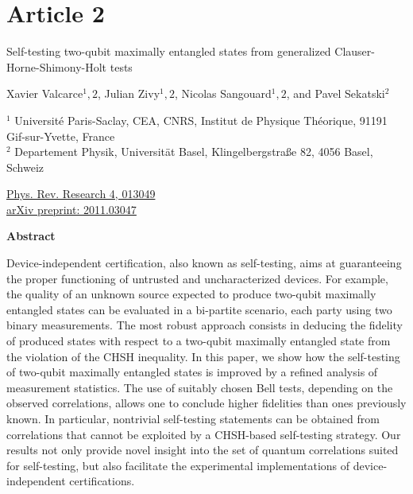\chapter*{Article 2}

\centering
\textrm{\LARGE Self-testing two-qubit maximally entangled states from generalized Clauser-Horne-Shimony-Holt tests}

\vspace{2cm}

\normalsize
Xavier Valcarce$^1,2$, Julian Zivy$^1,2$, Nicolas Sangouard$^1,2$, and Pavel Sekatski$^2$
\bigbreak

{\footnotesize
	$^1$ Université Paris-Saclay, CEA, CNRS, Institut de Physique Théorique, 91191 Gif-sur-Yvette, France \\
	$^2$ Departement Physik, Universität Basel, Klingelbergstraße 82, 4056 Basel, Schweiz
}

\raggedright
\bigbreak
\faLink \quad \href{https://journals.aps.org/prresearch/abstract/10.1103/PhysRevResearch.4.013049}{Phys. Rev. Research 4, 013049} \\
\faLink \quad \href{https://arxiv.org/abs/2011.03047}{arXiv preprint: 2011.03047}
\vspace{1cm}

\centering
\textbf{Abstract}
\bigbreak

Device-independent certification, also known as self-testing, aims at guaranteeing the proper functioning of untrusted and uncharacterized devices.
For example, the quality of an unknown source expected to produce two-qubit maximally entangled states can be evaluated in a bi-partite scenario, each party using two binary measurements.
The most robust approach consists in deducing the fidelity of produced states with respect to a two-qubit maximally entangled state from the violation of the CHSH inequality.
In this paper, we show how the self-testing of two-qubit maximally entangled states is improved by a refined analysis of measurement statistics.
The use of suitably chosen Bell tests, depending on the observed correlations, allows one to conclude higher fidelities than ones previously known.
In particular, nontrivial self-testing statements can be obtained from correlations that cannot be exploited by a CHSH-based self-testing strategy.
Our results not only provide novel insight into the set of quantum correlations suited for self-testing, but also facilitate the experimental implementations of device-independent certifications.
